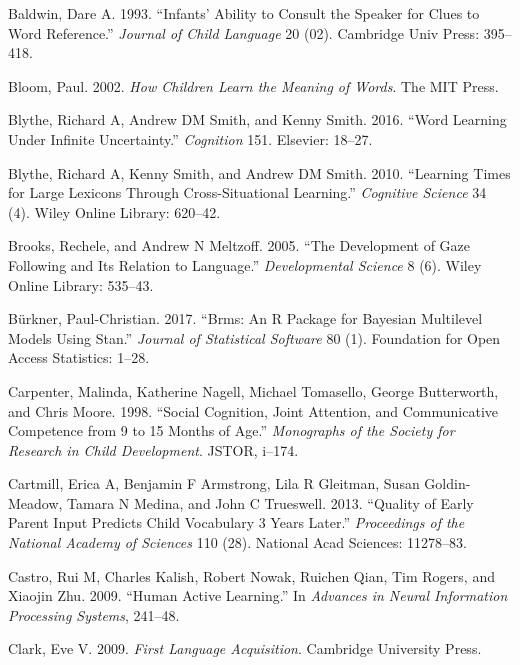 \documentclass[10pt, letterpaper]{article}
\begin{document}
\leavevmode\hypertarget{ref-baldwin1993infants}{}%
Baldwin, Dare A. 1993. ``Infants' Ability to Consult the Speaker for
Clues to Word Reference.'' \emph{Journal of Child Language} 20 (02).
Cambridge Univ Press: 395--418.

\leavevmode\hypertarget{ref-bloom2002children}{}%
Bloom, Paul. 2002. \emph{How Children Learn the Meaning of Words}. The
MIT Press.

\leavevmode\hypertarget{ref-blythe2016word}{}%
Blythe, Richard A, Andrew DM Smith, and Kenny Smith. 2016. ``Word
Learning Under Infinite Uncertainty.'' \emph{Cognition} 151. Elsevier:
18--27.

\leavevmode\hypertarget{ref-blythe2010learning}{}%
Blythe, Richard A, Kenny Smith, and Andrew DM Smith. 2010. ``Learning
Times for Large Lexicons Through Cross-Situational Learning.''
\emph{Cognitive Science} 34 (4). Wiley Online Library: 620--42.

\leavevmode\hypertarget{ref-brooks2005development}{}%
Brooks, Rechele, and Andrew N Meltzoff. 2005. ``The Development of Gaze
Following and Its Relation to Language.'' \emph{Developmental Science} 8
(6). Wiley Online Library: 535--43.

\leavevmode\hypertarget{ref-burkner2017brms}{}%
Bürkner, Paul-Christian. 2017. ``Brms: An R Package for Bayesian
Multilevel Models Using Stan.'' \emph{Journal of Statistical Software}
80 (1). Foundation for Open Access Statistics: 1--28.

\leavevmode\hypertarget{ref-carpenter1998social}{}%
Carpenter, Malinda, Katherine Nagell, Michael Tomasello, George
Butterworth, and Chris Moore. 1998. ``Social Cognition, Joint Attention,
and Communicative Competence from 9 to 15 Months of Age.''
\emph{Monographs of the Society for Research in Child Development}.
JSTOR, i--174.

\leavevmode\hypertarget{ref-cartmill2013quality}{}%
Cartmill, Erica A, Benjamin F Armstrong, Lila R Gleitman, Susan
Goldin-Meadow, Tamara N Medina, and John C Trueswell. 2013. ``Quality of
Early Parent Input Predicts Child Vocabulary 3 Years Later.''
\emph{Proceedings of the National Academy of Sciences} 110 (28).
National Acad Sciences: 11278--83.

\leavevmode\hypertarget{ref-castro2009human}{}%
Castro, Rui M, Charles Kalish, Robert Nowak, Ruichen Qian, Tim Rogers,
and Xiaojin Zhu. 2009. ``Human Active Learning.'' In \emph{Advances in
Neural Information Processing Systems}, 241--48.

\leavevmode\hypertarget{ref-clark2009first}{}%
Clark, Eve V. 2009. \emph{First Language Acquisition}. Cambridge
University Press.
\end{document}
